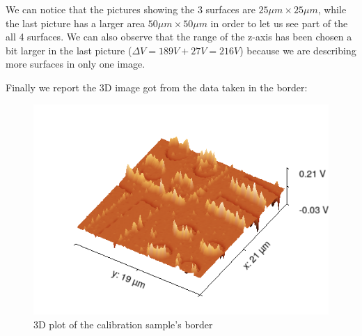 \documentclass[11pt,a4paper]{article}
\begin{document}
We can notice that the pictures showing the 3 surfaces are $25\mu m \times 25 \mu m$, while the last picture has a larger area $50\mu m \times 50 \mu m$ in order to let us see part of the all 4 surfaces. We can also observe that the range of the z-axis has been chosen a bit larger in the last picture ($\Delta V=189V+27V=216V$) because we are describing more surfaces in only one image.

Finally we report the 3D image got from the data taken in the border:
\begin{figure}[ht]
\begin{center}
\includegraphics[scale=0.47]{sm_border_3D}
\caption{3D plot of the calibration sample's border}\label{fig: cal sam border}
\end{center}
\end{figure}
\end{document}

